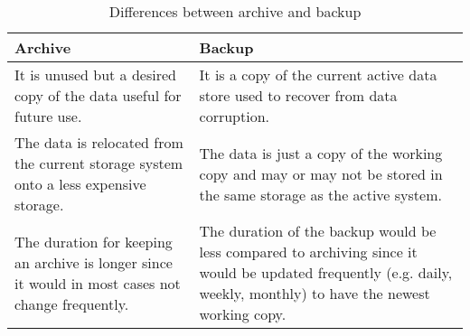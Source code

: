 \begin{table}[H]
    \centering
    \begin{tabular}{|p{7cm}|p{7cm}|}
        \hline
            \textbf{Archive}  & \textbf{Backup}\\
        \hline
            It is unused but a desired copy of the data useful for future use.& 
            It is a copy of the current active data store used to recover from data corruption. \\
        \hline
            The data is relocated from the current storage system onto a less expensive storage.
            & The data is just a copy of the working copy and may or may not be stored in the same storage as the active system.\\
        \hline
             The duration for keeping an archive is longer since it would in most cases not change frequently.
             & The duration of the backup would be less compared to archiving since it would be updated frequently (e.g. daily, weekly, monthly) to have the newest 
             working copy.\\
        \hline
    \end{tabular}
    \caption{Differences between archive and backup}
    \label{table:archiveVsBackup}     
\end{table}    